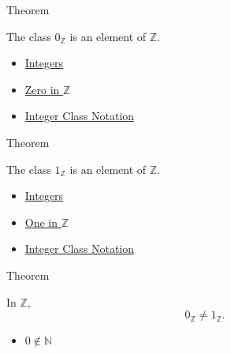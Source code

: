 \begin{theorembox}{Theorem}
\begin{theorem}
\label{thm:zero-is-an-integer}
The class $0_{\mathbb{Z}}$ is an element of $\mathbb{Z}$.
\end{theorem}
\end{theorembox}

\begin{dependencies}
\begin{itemize}
  \item \hyperref[def:integers]{Integers}
  \item \hyperref[def:zero-in-z]{Zero in $\mathbb{Z}$}
  \item \hyperref[def:integer-class-notation]{Integer Class Notation}
\end{itemize}
\end{dependencies}

\begin{theorembox}{Theorem}
\begin{theorem}
\label{thm:one-is-an-integer}
The class $1_{\mathbb{Z}}$ is an element of $\mathbb{Z}$.
\end{theorem}
\end{theorembox}

\begin{dependencies}
\begin{itemize}
  \item \hyperref[def:integers]{Integers}
  \item \hyperref[def:one-in-z]{One in $\mathbb{Z}$}
  \item \hyperref[def:integer-class-notation]{Integer Class Notation}
\end{itemize}
\end{dependencies}

\begin{theorembox}{Theorem}
\begin{theorem}
\label{thm:zero-not-one-in-z}
In $\mathbb{Z}$,
\[
0_{\mathbb{Z}}\ne 1_{\mathbb{Z}}.
\]
\end{theorem}
\end{theorembox}

\begin{dependencies}
\begin{itemize}
  \item \hyperref[thm:zero-not-in-n]{$0\notin\mathbb{N}$}
\end{itemize}
\end{dependencies}
